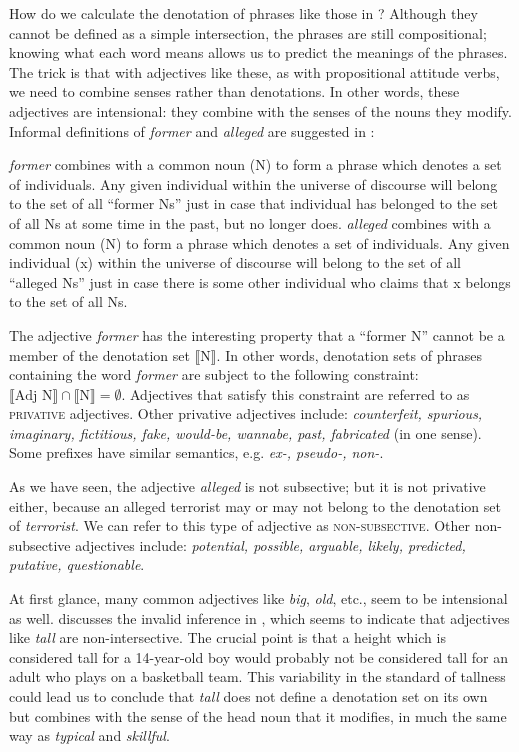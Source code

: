 How do we calculate the denotation of phrases like those in ? Although they cannot be defined as a simple intersection, the phrases are still compositional; knowing what each word means allows us to predict the meanings of the phrases. The trick is that with adjectives like these, as with propositional attitude verbs, we need to combine senses rather than denotations. In other words, these adjectives are intensional: they combine with the senses of the nouns they modify. Informal definitions of \textit{former} and \textit{alleged} are suggested in :\largerpage


\eanoraggedright \label{ex:15.11}
\eanoraggedright   \textit{former} combines with a common noun (N) to form a phrase which denotes a set of individuals. Any given individual within the universe of discourse will belong to the set of all “former Ns” just in case that individual has belonged to the set of all Ns at some time in the past, but no longer does.
\ex  \textit{alleged} combines with a common noun (N) to form a phrase which denotes a set of individuals. Any given individual (x) within the universe of discourse will belong to the set of all “alleged Ns” just in case there is some other individual who claims that x belongs to the set of all Ns.
\z \z


The adjective \textit{former} has the interesting property that a “former N” cannot be a member of the denotation set $\llbracket$N$\rrbracket$. In other words, denotation sets of phrases containing the word \textit{former} are subject to the following constraint: $\llbracket \text{Adj~N}\rrbracket \cap \llbracket \text{N} \rrbracket = ∅$. Adjectives that satisfy this constraint are referred to as \textsc{privative} adjectives. Other privative adjectives include: \textit{counterfeit, spurious, imaginary, fictitious, fake, would-be, wannabe, past, fabricated} (in one sense). Some prefixes have similar semantics, e.g. \textit{ex-, pseudo-, non-}.



As we have seen, the adjective \textit{alleged} is not subsective; but it is not privative either, because an alleged terrorist may or may not belong to the denotation set of \textit{terrorist}. We can refer to this type of adjective as \textsc{non-subsective}. Other non-subsective adjectives include: \textit{potential, possible, arguable, likely, predicted, putative, questionable}.



At first glance, many common adjectives like \textit{big}, \textit{old}, etc., seem to be intensional as well. \citet{Partee1995} discusses the invalid inference in , which seems to indicate that adjectives like \textit{tall} are non-intersective. The crucial point is that a height which is considered tall for a 14-year-old boy would probably not be considered tall for an adult who plays on a basketball team. This variability in the standard of tallness could lead us to conclude that \textit{tall} does not define a denotation set on its own but combines with the sense of the head noun that it modifies, in much the same way as \textit{typical} and \textit{skillful}.


